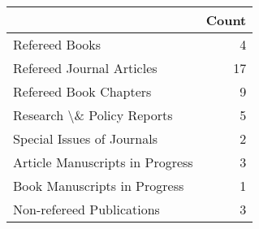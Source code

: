 \begin{tabular}{lr}
\toprule
 & Count \\
\midrule
Refereed Books & 4 \\
Refereed Journal Articles & 17 \\
Refereed Book Chapters & 9 \\
Research \textbackslash \& Policy Reports & 5 \\
Special Issues of Journals & 2 \\
Article Manuscripts in Progress & 3 \\
Book Manuscripts in Progress & 1 \\
Non-refereed Publications & 3 \\
\bottomrule
\end{tabular}
